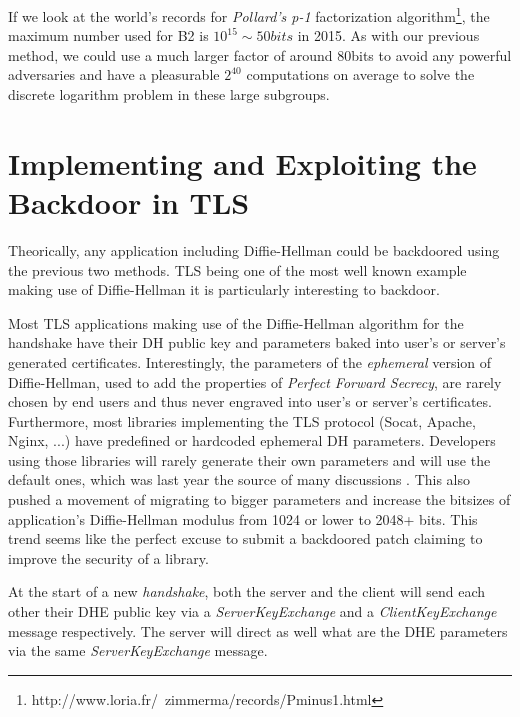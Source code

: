 \documentclass[a4paper,11pt,twocolumn]{article}
\begin{document}
If we look at the world's records for \emph{Pollard's p-1} factorization algorithm\footnote{http://www.loria.fr/~zimmerma/records/Pminus1.html}, the maximum number used for B2 is $10^{15} \sim 50bits$ in 2015. As with our previous method, we could use a much larger factor of around 80bits to avoid any powerful adversaries and have a pleasurable $2^{40}$ computations on average to solve the discrete logarithm problem in these large subgroups.


\section{Implementing and Exploiting the Backdoor in TLS}


Theorically, any application including Diffie-Hellman could be backdoored using the previous two methods. TLS being one of the most well known example making use of Diffie-Hellman it is particularly interesting to backdoor.

Most TLS applications making use of the Diffie-Hellman algorithm for the handshake have their DH public key and parameters baked into user's or server's generated certificates. Interestingly, the parameters of the \emph{ephemeral} version of Diffie-Hellman, used to add the properties of \emph{Perfect Forward Secrecy}, are rarely chosen by end users and thus never engraved into user's or server's certificates. Furthermore, most libraries implementing the TLS protocol (Socat, Apache, Nginx, ...) have predefined or hardcoded ephemeral DH parameters. Developers using those libraries will rarely generate their own parameters and will use the default ones, which was last year the source of many discussions . This also pushed a movement of migrating to bigger parameters and increase the bitsizes of application's Diffie-Hellman modulus from 1024 or lower to 2048+ bits. This trend seems like the perfect excuse to submit a backdoored patch claiming to improve the security of a library.

At the start of a new \emph{handshake}, both the server and the client will send each other their DHE public key via a \emph{ServerKeyExchange} and a \emph{ClientKeyExchange} message respectively. The server will direct as well what are the DHE parameters via the same \emph{ServerKeyExchange} message.
\end{document}
